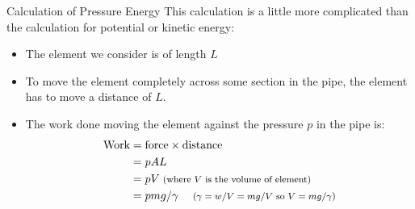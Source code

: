 \documentclass[9pt,xcolor={svgnames, x11names},professionalfonts, mathserif]{beamer}
\begin{document}
\begin{frame}{Calculation of Pressure Energy}
	This calculation is a little more complicated than the calculation for potential or kinetic energy:
	\par\vspace{-0.5cm}
	\par\vspace{-0.75cm}
	\begin{itemize}
		\item The element we consider is of length $L$
		\item To move the element completely across some section in the pipe, the element has to move a distance of $L$.
		      
		\item The work done moving the element against the pressure $p$ in the pipe is:
		      \begin{align*}
		      	\text{Work} & = \text{force}\times\text{distance}                                              \\
		      	            & = pAL                                                                            \\
		      	            & = pV \text{\footnotesize{ (where $V$ is the volume of element)}}                 \\
		      	            & = pmg/\gamma\quad \text{\footnotesize{ ($\gamma =w/V=mg/V$  so $ V=mg/\gamma)$}} \\
		      \end{align*}
	\end{itemize}
\end{frame}

\end{document}
